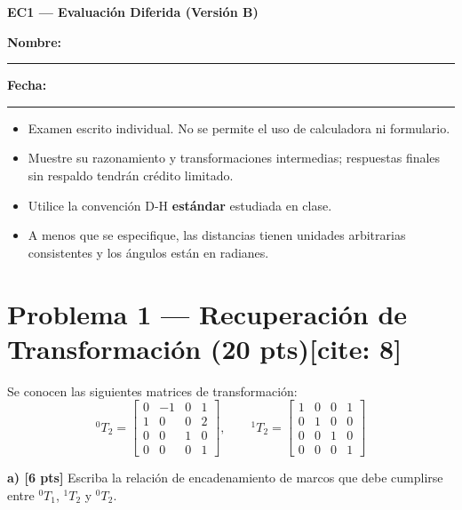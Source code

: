 \documentclass[11pt, a4paper]{article}
\begin{document}
\begin{center}
    \Large\textbf{\textcolor{ucbblue}{EC1 — Evaluación Diferida (Versión B)}}\\[0.2cm]
\end{center}

\textbf{Nombre:} \rule{8cm}{0.15mm} \hfill \textbf{Fecha:} \rule{4cm}{0.15mm}

\vspace{0.4cm}
\begin{tcolorbox}[colback=gray!5, colframe=gray!50, title=\textbf{Condiciones de la Evaluación[cite: 8, 9]}]
    \begin{itemize}
        \item Examen escrito individual. No se permite el uso de calculadora ni formulario.
        \item Muestre su razonamiento y transformaciones intermedias; respuestas finales sin respaldo tendrán crédito limitado.
        \item Utilice la convención D-H \textbf{estándar} estudiada en clase.
        \item A menos que se especifique, las distancias tienen unidades arbitrarias consistentes y los ángulos están en radianes.
    \end{itemize}
\end{tcolorbox}

\section*{Problema 1 — Recuperación de Transformación (20 pts)[cite: 8]}
Se conocen las siguientes matrices de transformación:
\begin{equation*}
    {}^{0}T_2 = \begin{bmatrix} 0 & -1 & 0 & 1 \\ 1 & 0 & 0 & 2 \\ 0 & 0 & 1 & 0 \\ 0 & 0 & 0 & 1 \end{bmatrix}, \qquad
    {}^{1}T_2 = \begin{bmatrix} 1 & 0 & 0 & 1 \\ 0 & 1 & 0 & 0 \\ 0 & 0 & 1 & 0 \\ 0 & 0 & 0 & 1 \end{bmatrix}
\end{equation*}

\textbf{a) [6 pts]} Escriba la relación de encadenamiento de marcos que debe cumplirse entre ${}^{0}T_1$, ${}^{1}T_2$ y ${}^{0}T_2$.
\end{document}
